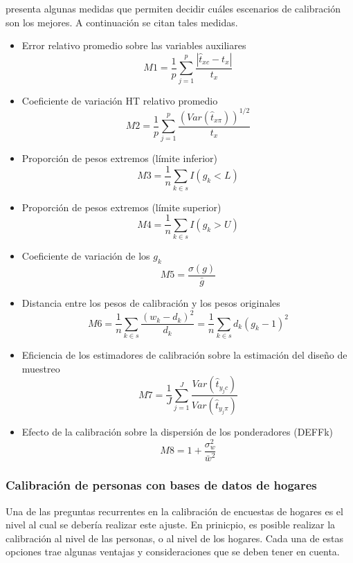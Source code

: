 \documentclass[12pt,spanish,]{book}
\begin{document}
\textcite{Silva_2004} presenta algunas medidas que permiten decidir cuáles escenarios de calibración son los mejores. A continuación se citan tales medidas.

\begin{itemize}
\item
  Error relativo promedio sobre las variables auxiliares
  \[
  M1= \frac{1}{p} \sum_{j=1}^p \frac{|\hat{t}_{xc} - t_x|}{t_x}
  \]
\item
  Coeficiente de variación HT relativo promedio
  \[M2= \frac{1}{p} \sum_{j=1}^p \frac{(Var(\hat{t}_{x\pi}))^{1/2}}{t_x} \]
\item
  Proporción de pesos extremos (límite inferior)
  \[M3 = \frac{1}{n} \sum_{k \in s}I(g_k<L)\]
\item
  Proporción de pesos extremos (límite superior)
  \[M4= \frac{1}{n} \sum_{k \in s}I(g_k>U)\]
\item
  Coeficiente de variación de los \(g_k\)
  \[M5= \frac{\sigma(g)}{\bar{g}}\]
\item
  Distancia entre los pesos de calibración y los pesos originales
  \[M6 = \frac{1}{n}\sum_{k \in s} \frac{(w_k - d_k)^2}{d_k}
  = \frac{1}{n}\sum_{k \in s} d_k(g_k - 1)^2\]
\item
  Eficiencia de los estimadores de calibración sobre la estimación del diseño de muestreo
  \[M7 = \frac{1}{J}\sum_{j=1}^J \frac{Var(\hat{t}_{y_jc})}{Var(\hat{t}_{y_j\pi})} \]
\item
  Efecto de la calibración sobre la dispersión de los ponderadores (DEFFk)
  \[M8 = 1+\frac{\sigma^2_w}{\bar{w}^2}\]
\end{itemize}

\hypertarget{calibracion-de-personas-con-bases-de-datos-de-hogares}{%
\subsubsection*{Calibración de personas con bases de datos de hogares}\label{calibracion-de-personas-con-bases-de-datos-de-hogares}}

Una de las preguntas recurrentes en la calibración de encuestas de hogares es el nivel al cual se debería realizar este ajuste. En prinicpio, es posible realizar la calibración al nivel de las personas, o al nivel de los hogares. Cada una de estas opciones trae algunas ventajas y consideraciones que se deben tener en cuenta.
\end{document}

